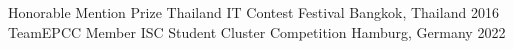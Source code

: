 


\begin{cvhonors}

  \cvhonor
    {Honorable Mention Prize} %
    {Thailand IT Contest Festival} %
    {Bangkok, Thailand} %
    {2016} %
  \cvhonor
    {TeamEPCC Member}
    {ISC Student Cluster Competition}
    {Hamburg, Germany}
    {2022}
\end{cvhonors}
